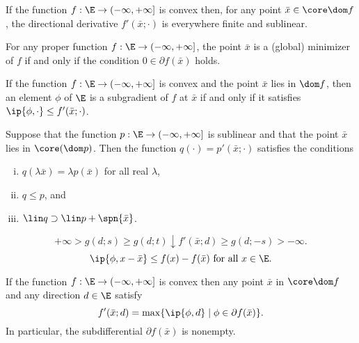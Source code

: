 \documentclass[../borwein-lewis_notes.tex]{subfiles}
\begin{document}
\begin{proposition}
If the function $f: \E \to (-\infty, +\infty]$ is convex then, for any 
point $\bar x\in\core\dom f$, the directional derivative $f'(\bar x;\cdot)$
is everywhere finite and sublinear.
\end{proposition}
\begin{proposition}
For any proper function $f:\E\to(-\infty,+\infty]$, the point $\bar x$ 
is a (global) minimizer of $f$ if and only if the condition $0\in
\partial f(\bar x)$ holds.
\label{3.1.5}
\end{proposition}
\begin{proposition}
If the function $f:\E\to(-\infty,+\infty]$ is convex and the point 
$\bar x$ lies in $\dom f$, then an element $\phi$ of $\E$ is a subgradient 
of $f$ at $\bar x$ if and only if it satisfies $\ip{\phi,\cdot}\leq 
f'(\bar x;\cdot)$.
\label{3.1.6}
\end{proposition}
\begin{lemma}[3.1.7]
\label{3.1.7}
Suppose that the function $p:\E\to(-\infty,+\infty]$ is sublinear and 
that the point $\bar x$ lies in $\core(\dom p)$. Then the function 
$q(\cdot)=p'(\bar x;\cdot)$ satisfies the conditions
\begin{enumerate}[(i)]
\item $q(\lambda\bar x) = \lambda p(\bar x)$ for all real $\lambda$, 
\item $q\leq p$, and 
\item $\lin q \supset \lin p + \spn\{\bar x\}$.
\end{enumerate}
\end{lemma}
\begin{equation}
\label{3.1.3}
+\infty > g(d;s) \geq g(d;t)\downarrow f'(\bar x;d)\geq g(d;-s)>-\infty.
\end{equation}
\begin{equation}
\label{3.1.4}
\ip{\phi, x-\bar x} \leq f(x)-f(\bar x) \text{ for all }x\in \E.
\end{equation}
\begin{theorem}
If the function $f:\E\to (-\infty,+\infty]$ is convex then any point 
$\bar x$ in $\core\dom f$ and any direction $d\in\E$ satisfy 
\begin{equation}
f'(\bar x; d) = \max\{\ip{\phi,d}\mid \phi\in\partial f(\bar x)\}.
\label{3.1.9}
\end{equation}
In particular, the subdifferential $\partial f(\bar x)$ is nonempty.
\label{3.1.8}
\end{theorem}
\end{document}
